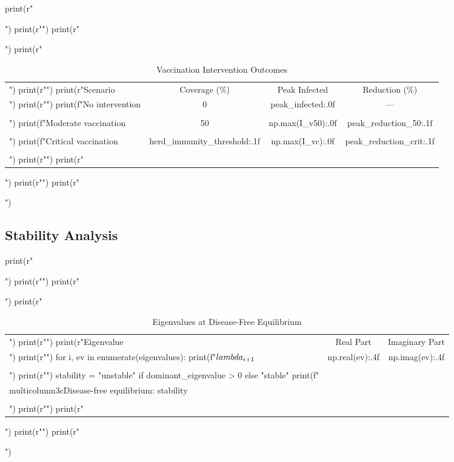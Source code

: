 \documentclass[a4paper, 11pt]{article}
\begin{document}
\begin{pycode}
print(r"\begin{table}[htbp]")
print(r"\centering")
print(r"\caption{Vaccination Intervention Outcomes}")
print(r"\begin{tabular}{lccc}")
print(r"\toprule")
print(r"Scenario & Coverage (\%) & Peak Infected & Reduction (\%) \\")
print(r"\midrule")
print(f"No intervention & 0 & {peak_infected:.0f} & --- \\\\")
print(f"Moderate vaccination & 50 & {np.max(I_v50):.0f} & {peak_reduction_50:.1f} \\\\")
print(f"Critical vaccination & {herd_immunity_threshold:.1f} & {np.max(I_vc):.0f} & {peak_reduction_crit:.1f} \\\\")
print(r"\bottomrule")
print(r"\end{tabular}")
print(r"\label{tab:interventions}")
print(r"\end{table}")
\end{pycode}

\subsection{Stability Analysis}

\begin{pycode}
print(r"\begin{table}[htbp]")
print(r"\centering")
print(r"\caption{Eigenvalues at Disease-Free Equilibrium}")
print(r"\begin{tabular}{lcc}")
print(r"\toprule")
print(r"Eigenvalue & Real Part & Imaginary Part \\")
print(r"\midrule")
for i, ev in enumerate(eigenvalues):
    print(f"$\\lambda_{i+1}$ & {np.real(ev):.4f} & {np.imag(ev):.4f} \\\\")
print(r"\midrule")
stability = "unstable" if dominant_eigenvalue > 0 else "stable"
print(f"\\multicolumn{{3}}{{c}}{{Disease-free equilibrium: {stability}}} \\\\")
print(r"\bottomrule")
print(r"\end{tabular}")
print(r"\label{tab:eigenvalues}")
print(r"\end{table}")
\end{pycode}
\end{document}
